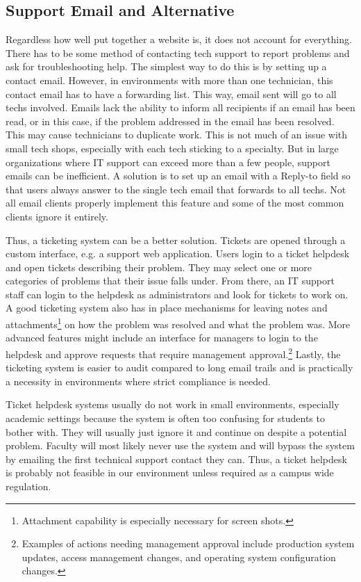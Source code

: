 \subsection{Support Email and Alternative}

Regardless how well put together a website is, it does not account for everything.  There has to be some method of contacting tech support to report problems and ask for troubleshooting help.  The simplest way to do this is by setting up a contact email.  However, in environments with more than one technician, this contact email has to have a forwarding list.  This way, email sent will go to all techs involved.  Emails lack the ability to inform all recipients if an email has been read, or in this case, if the problem addressed in the email has been resolved.  This may cause technicians to duplicate work.  This is not much of an issue with small tech shops, especially with each tech sticking to a specialty.  But in large organizations where IT support can exceed more than a few people, support emails can be inefficient.  A solution is to set up an email with a Reply-to field so that users always answer to the single tech email that forwards to all techs.  Not all email clients properly implement this feature and some of the most common clients ignore it entirely.

Thus, a ticketing system can be a better solution.  Tickets are opened through a custom interface, e.g. a support web application.  Users login to a ticket helpdesk and open tickets describing their problem.  They may select one or more categories of problems that their issue falls under.  From there, an IT support staff can login to the helpdesk as administrators and look for tickets to work on.  A good ticketing system also has in place mechanisms for leaving notes and attachments\footnote{Attachment capability is especially necessary for screen shots.} on how the problem was resolved and what the problem was.  More advanced features might include an interface for managers to login to the helpdesk and approve requests that require management approval.\footnote{Examples of actions needing management approval include production system updates, access management changes, and operating system configuration changes.}  Lastly, the ticketing system is easier to audit compared to long email trails and is practically a necessity in environments where strict compliance is needed.   

Ticket helpdesk systems usually do not work in small environments, especially academic settings because the system is often too confusing for students to bother with.  They will usually just ignore it and continue on despite a potential problem.  Faculty will most likely never use the system and will bypass the system by emailing the first technical support contact they can.  Thus, a ticket helpdesk is probably not feasible in our environment unless required as a campus wide regulation.  

